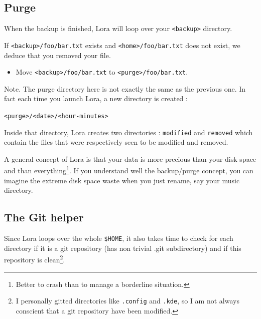 \documentclass[a4paper,12pt]{article}
\newcommand{\info}[1]{\texttt{#1}}
\begin{document}
\subsection{Purge}

When the backup is finished, Lora will loop over your \info{<backup>} directory.

If \info{<backup>/foo/bar.txt} exists and \info{<home>/foo/bar.txt} does not exist, we deduce that you removed your file.
\begin{itemize}
    \item 
        Move \info{<backup>/foo/bar.txt} to \info{<purge>/foo/bar.txt}.
\end{itemize}
Note. The purge directory here is not exactly the same as the previous one. In fact each time you launch Lora, a new directory is created :
\begin{center}
    \info{<purge>/<date>/<hour-minutes>}
\end{center}
Inside that directory, Lora creates two directories : \info{modified} and \info{removed} which contain the files that were respectively seen to be modified and removed.

A general concept of Lora is that your data is more precious than your disk space and than everything\footnote{Better to crash than to manage a borderline situation.}. If you understand well the backup/purge concept, you can imagine the extreme disk space waste when you just rename, say your music directory.

\subsection{The Git helper}

Since Lora loops over the whole \info{\$HOME}, it also takes time to check for each directory if it is a git repository (has non trivial .git subdirectory) and if this repository is clean\footnote{I personally gitted directories like \info{.config} and \info{.kde}, so I am not always conscient that a git repository have been modified.}.
\end{document}

